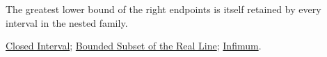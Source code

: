 \begin{remark*}[Interpretation]
The greatest lower bound of the right endpoints is itself retained by every
interval in the nested family.
\end{remark*}

\begin{dependencies}
\hyperref[def:closed-interval]{Closed Interval};
\hyperref[def:bounded-subset-of-r]{Bounded Subset of the Real Line};
\hyperref[def:infimum]{Infimum}.
\end{dependencies}

